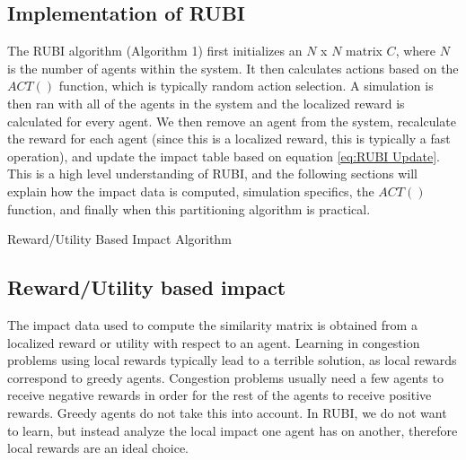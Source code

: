 \documentclass{aamas2014}
\begin{document}
\subsection{Implementation of RUBI}
The RUBI algorithm (Algorithm 1) first initializes an $N$ x $N$ matrix $C$, where $N$ is the number of agents within the system. It then calculates actions based on the $ACT()$ function, which is typically random action selection. A simulation is then ran with all of the agents in the system and the localized reward is calculated for every agent. We then remove an agent from the system, recalculate the reward for each agent (since this is a localized reward, this is typically a fast operation), and update the impact table based on equation \ref{eq:RUBI Update}. This is a high level understanding of RUBI, and the following sections will explain how the impact data is computed, simulation specifics, the $ACT()$ function, and finally when this partitioning algorithm is practical.

\begin{algorithm} \label{alg:RUBI}
  \caption{Reward/Utility Based Impact Algorithm}
  \begin{algorithmic}[1]
    \Statex
				\EndFor
		\EndFor
	\EndFor        
    \EndFunction
  \end{algorithmic}
\end{algorithm}

\subsection{Reward/Utility based impact}
The impact data used to compute the similarity matrix is obtained from a localized reward or utility with respect to an agent. Learning in congestion problems using local rewards typically lead to a terrible solution, as local rewards correspond to greedy agents. Congestion problems usually need a few agents to receive negative rewards in order for the rest of the agents to receive positive rewards. Greedy agents do not take this into account. In RUBI, we do not want to learn, but instead analyze the local impact one agent has on another, therefore local rewards are an ideal choice.
\end{document}
